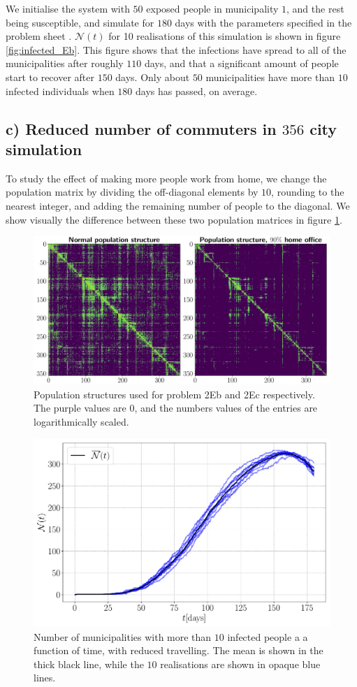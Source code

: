 We initialise the system with $50$ exposed people in municipality $1$, and the rest being susceptible, and simulate for $180$ days with the parameters specified in the problem sheet \cite{sheet}. $\mathcal{N}(t)$ for 10 realisations of this simulation is shown in figure \ref{fig:infected_Eb}. This figure shows that the infections have spread to all of the municipalities after roughly $110$ days, and that a significant amount of people start to recover after $150$ days. Only about $50$ municipalities have more than $10$ infected individuals when $180$ days has passed, on average.    

\subsection{c) Reduced number of commuters in $356$ city simulation}

To study the effect of making more people work from home, we change the population matrix by dividing the off-diagonal elements by $10$, rounding to the nearest integer, and adding the remaining number of people to the diagonal. We show visually the difference between these two population matrices in figure \ref{fig:matrices}.  
\begin{figure}[htb]
	\centering
	\includegraphics[width=0.9\columnwidth]{../fig/matrices.pdf}
	\caption{Population structures used for problem 2Eb and 2Ec respectively. The purple values are 0, and the numbers values of the entries are logarithmically scaled.}
	\label{fig:matrices}
\end{figure}
\begin{figure}[h!]
	\centering
	\includegraphics[width=0.9\columnwidth]{../fig/2Ec_N.pdf}
	\caption{Number of municipalities with more than $10$ infected people a a function of time, with reduced travelling.  The mean is shown in the thick black line, while the $10$ realisations are shown in opaque blue lines.}
	\label{fig:infected_Ec}
\end{figure}

